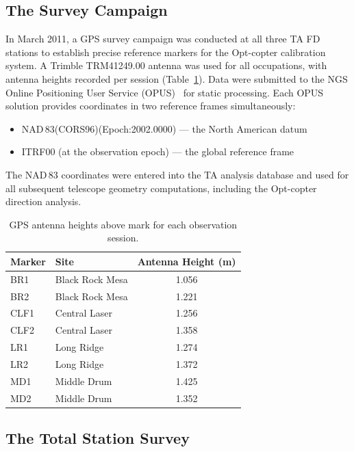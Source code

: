 \documentclass[11pt,letterpaper]{article}
\begin{document}
\subsection{The Survey Campaign}

In March 2011, a GPS survey campaign was conducted at all three TA FD stations to establish precise reference markers for the Opt-copter calibration system. A Trimble TRM41249.00 antenna was used for all occupations, with antenna heights recorded per session (Table~\ref{tab:antenna_heights}). Data were submitted to the NGS Online Positioning User Service (OPUS)~\cite{soler2003} for static processing. Each OPUS solution provides coordinates in two reference frames simultaneously:

\begin{itemize}[nosep]
    \item NAD\,83(CORS96)(Epoch:2002.0000) --- the North American datum
    \item ITRF00 (at the observation epoch) --- the global reference frame
\end{itemize}

\noindent The NAD\,83 coordinates were entered into the TA analysis database and used for all subsequent telescope geometry computations, including the Opt-copter direction analysis.

\begin{table}[H]
\centering
\caption{GPS antenna heights above mark for each observation session.}
\label{tab:antenna_heights}
\smallskip
\begin{tabular}{@{}llc@{}}
\toprule
{Marker} & {Site} & {Antenna Height (m)} \\
\midrule
BR1  & Black Rock Mesa  & 1.056 \\
BR2  & Black Rock Mesa  & 1.221 \\
CLF1 & Central Laser    & 1.256 \\
CLF2 & Central Laser    & 1.358 \\
LR1  & Long Ridge       & 1.274 \\
LR2  & Long Ridge       & 1.372 \\
MD1  & Middle Drum      & 1.425 \\
MD2  & Middle Drum      & 1.352 \\
\bottomrule
\end{tabular}
\end{table}

\subsection{The Total Station Survey}
\label{sec:total_station}
\end{document}
